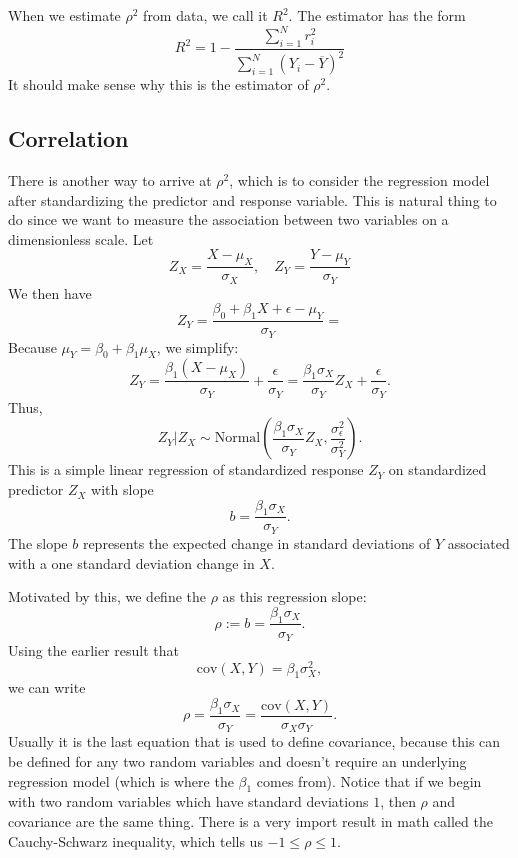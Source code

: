 When we estimate $\rho^2$ from data, we call it $R^2$. The estimator has the form
\begin{equation}
R^2 = 1 - \frac{\sum_{i=1}^Nr_i^2}{\sum_{i=1}^N(Y_i - \overline{Y})^2}
\end{equation}
It should make sense why this is the estimator of $\rho^2$. 

\subsection{Correlation}
There is another way to arrive at $\rho^2$, which is to consider the regression model after standardizing the predictor and response variable. This is natural thing to do since we want to measure the association between two variables on a dimensionless scale. Let 
\begin{equation}
Z_ X = \frac{X- \mu_X}{\sigma_X},\quad Z_ Y = \frac{Y- \mu_Y}{\sigma_Y}
\end{equation} 
We then have
\begin{equation}
Z_ Y = \frac{\beta_0 + \beta_1 X + \epsilon - \mu_Y}{\sigma_Y} = 
\end{equation}
Because \(\mu_Y = \beta_0 + \beta_1 \mu_X\), we simplify:
\[
Z_Y = \frac{\beta_1 (X - \mu_X)}{\sigma_Y} + \frac{\epsilon}{\sigma_Y} = \frac{\beta_1 \sigma_X}{\sigma_Y} Z_X + \frac{\epsilon}{\sigma_Y}.
\]
Thus,
\[
Z_Y \big| Z_X \sim \text{Normal}\left( \frac{\beta_1 \sigma_X}{\sigma_Y} Z_X, \frac{\sigma_\epsilon^2}{\sigma_Y^2} \right).
\]
This is a simple linear regression of standardized response \(Z_Y\) on standardized predictor \(Z_X\) with slope 
\[
b = \frac{\beta_1 \sigma_X}{\sigma_Y}.
\]
 The slope \(b\) represents the expected change in standard deviations of \(Y\) associated with a one standard deviation change in \(X\).

Motivated by this, we define the  \(\rho\) as this regression slope:
\[
\rho := b = \frac{\beta_1 \sigma_X}{\sigma_Y}.
\]
Using the earlier result that 
\[
\mathrm{cov}(X,Y) = \beta_1 \sigma_X^2,
\]
we can write
\[
\rho = \frac{\beta_1 \sigma_X}{\sigma_Y} = \frac{\mathrm{cov}(X,Y)}{\sigma_X \sigma_Y}.
\]
Usually it is the last equation that is used to define covariance, because this can be defined for any two random variables and doesn't require an underlying regression model (which is where the $\beta_1$ comes from). 
Notice that if we begin with two random variables which have standard deviations $1$, then $\rho$ and covariance are the same thing. There is a very import result in math called the Cauchy-Schwarz inequality, which tells us $-1 \le \rho\le 1$. 

